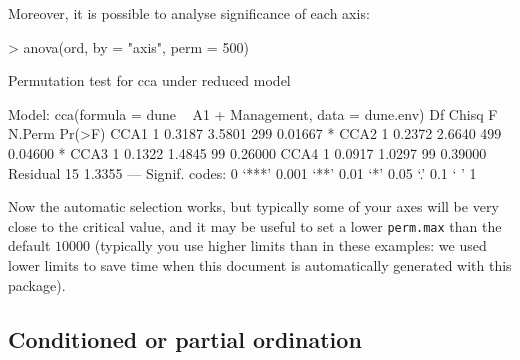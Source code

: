 \documentclass[a4paper,10pt]{amsart}
\begin{document}
Moreover, it is possible to analyse significance of each axis:
\begin{Schunk}
\begin{Sinput}
> anova(ord, by = "axis", perm = 500)
\end{Sinput}
\begin{Soutput}
Permutation test for cca under reduced model

Model: cca(formula = dune ~ A1 + Management, data = dune.env)
         Df  Chisq      F N.Perm  Pr(>F)  
CCA1      1 0.3187 3.5801    299 0.01667 *
CCA2      1 0.2372 2.6640    499 0.04600 *
CCA3      1 0.1322 1.4845     99 0.26000  
CCA4      1 0.0917 1.0297     99 0.39000  
Residual 15 1.3355                        
---
Signif. codes:  0 ‘***’ 0.001 ‘**’ 0.01 ‘*’ 0.05 ‘.’ 0.1 ‘ ’ 1 
\end{Soutput}
\end{Schunk}
Now the automatic selection works, but typically some of your axes
will be very close to the critical value, and it may be useful to set
a lower \texttt{perm.max} than the default $10000$ (typically you use
higher limits than in these examples: we used lower limits to save
time when this document is automatically generated with this package).

\subsection{Conditioned or partial ordination}
\end{document}
